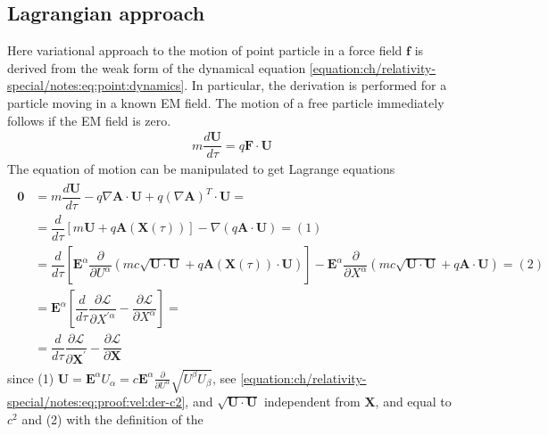 \documentclass[letterpaper,10pt,english]{jupyterBook}
\begin{document}
\subsection{Lagrangian approach}
\label{\detokenize{ch/relativity-special/notes:lagrangian-approach}}
\sphinxAtStartPar
Here variational approach to the motion of point particle in a force field \(\mathbf{f}\) is derived from the weak form of the dynamical equation \eqref{equation:ch/relativity-special/notes:eq:point:dynamics}. In particular, the derivation is performed for a particle moving in a known EM field. The motion of a free particle immediately follows if the EM field is zero.
\begin{equation*}
\begin{split}m \dfrac{d \mathbf{U}}{d \tau} = q \mathbf{F} \cdot \mathbf{U}\end{split}
\end{equation*}
\sphinxAtStartPar
The equation of motion can be manipulated to get Lagrange equations
\begin{equation}\label{equation:ch/relativity-special/notes:eq:point:dynamics:lagrange}
\begin{split}\begin{aligned}
  \mathbf{0} 
  & = m \dfrac{d \mathbf{U}}{d \tau} - q \nabla \mathbf{A} \cdot \mathbf{U} + q \left( \nabla \mathbf{A} \right)^T \cdot \mathbf{U} = \\
  & = \dfrac{d}{d\tau} \left[ m \mathbf{U} + q \mathbf{A}(\mathbf{X}(\tau)) \right] - \nabla \left( q \mathbf{A} \cdot \mathbf{U} \right) = (1) \\
  & = \dfrac{d}{d\tau} \left[ \mathbf{E}^\alpha \dfrac{\partial}{\partial U^\alpha} \left( m c \sqrt{\mathbf{U} \cdot \mathbf{U}}  + q \mathbf{A}(\mathbf{X}(\tau)) \cdot \mathbf{U} \right) \right] - \mathbf{E}^\alpha \dfrac{\partial}{\partial X^\alpha} \left( m c \sqrt{\mathbf{U} \cdot \mathbf{U}}  + q \mathbf{A} \cdot \mathbf{U} \right) = (2) \\
  & = \mathbf{E}^{\alpha} \left[ \dfrac{d}{d\tau} \dfrac{\partial \mathscr{L}}{\partial X^{'\alpha}} - \dfrac{\partial \mathscr{L}}{\partial X^{\alpha}} \right] = \\
  & = \dfrac{d}{d\tau} \dfrac{\partial \mathscr{L}}{\partial \mathbf{X}^{'}} - \dfrac{\partial \mathscr{L}}{\partial \mathbf{X}}
\end{aligned}\end{split}
\end{equation}
\sphinxAtStartPar
since (1) \(\mathbf{U} = \mathbf{E}^{\alpha} U_\alpha = c \mathbf{E}^{\alpha} \frac{\partial}{\partial U^\alpha} \sqrt{U^{\beta} U_{\beta}}\), see \eqref{equation:ch/relativity-special/notes:eq:proof:vel:der-c2}, and \(\sqrt{\mathbf{U} \cdot \mathbf{U}}\) independent from \(\mathbf{X}\), and equal to \(c^2\) and (2) with the definition of the 
\end{document}
